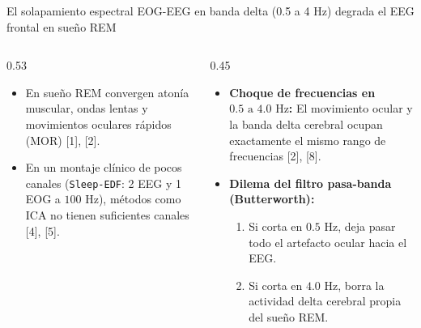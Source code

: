 \documentclass[aspectratio=169,9pt]{beamer}
\begin{document}
\begin{frame}{El solapamiento espectral EOG-EEG en banda delta (0.5 a 4 Hz) degrada el EEG frontal en sue\~no REM}
\begin{columns}[T,onlytextwidth]
\begin{column}{0.53\textwidth}
\begin{tcolorbox}[basecard, title={\scriptsize\bfseries Mecanismo F\'isico: Conducci\'on de Volumen Oculo-Cortical}, colbacktitle=UDNavy, coltitle=white]
        \vspace{0.05cm}
        \begin{itemize}\scriptsize
          \item En sue\~no REM convergen aton\'ia muscular, ondas lentas y movimientos oculares r\'apidos (MOR) [1], [2].
          \item En un montaje cl\'inico de pocos canales (\texttt{Sleep-EDF}: 2 EEG y 1 EOG a $100\text{ Hz}$), m\'etodos como ICA no tienen suficientes canales [4], [5].
        \end{itemize}
      \end{tcolorbox}
    \end{column}

    \begin{column}{0.45\textwidth}
      \begin{tcolorbox}[redcard, title={\scriptsize\bfseries Limitaci\'on del Filtrado Cl\'asico en Frecuencia}, colbacktitle=UDTerracotta!85!black, coltitle=white]
        \scriptsize
        \begin{itemize}
          \item \textbf{Choque de frecuencias en $0.5\text{ a }4.0\text{ Hz}$:} El movimiento ocular y la banda delta cerebral ocupan exactamente el mismo rango de frecuencias [2], [8].
          \item \textbf{Dilema del filtro pasa-banda (Butterworth):}
            \begin{enumerate}\scriptsize
              \item Si corta en $0.5\text{ Hz}$, deja pasar todo el artefacto ocular hacia el EEG.
              \item Si corta en $4.0\text{ Hz}$, borra la actividad delta cerebral propia del sue\~no REM.
            \end{enumerate}
        \end{itemize}
      \end{tcolorbox}


\end{column}
\end{columns}
\end{frame}
\end{document}
